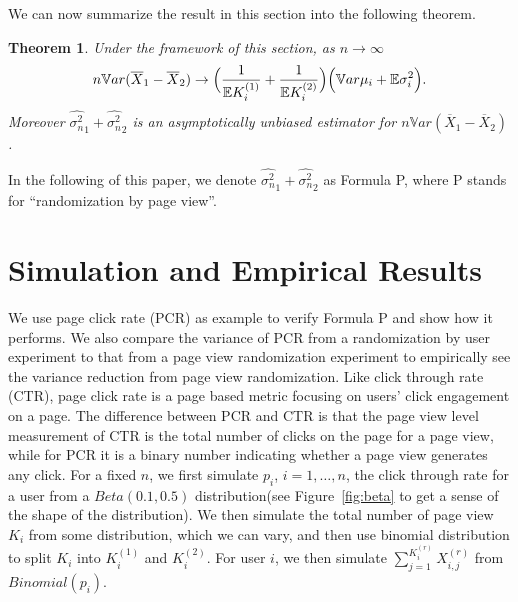 \documentclass[11pt]{asaproc}
\newcommand{\wht}{\widehat}
\newcommand{\var}{\ensuremath{\mathbb Var}}
\newcommand{\bbe}{\mathbb{E}}
\newcommand{\xbar}{\overline{X}}
\newcommand{\naiveest}{\wht{\sigma^2_n}}
\newtheorem{thm}{Theorem}
\begin{document}
We can now summarize the result in this section into the following theorem.
\begin{thm}\label{p_thm1}
Under the framework of this section, as $n\to\infty$
\begin{align*}
n\var(\xbar_1-\xbar_2) \to \Bigl(\frac{1 }{\bbe K_i^{(1)}}+\frac{1}{\bbe K_i^{(2)}}\Bigr) \Bigl( \var \mu_i + \bbe \sigma_i^2\Bigr).
\end{align*}
Moreover $\naiveest_1+\naiveest_2$ is an asymptotically unbiased estimator for $n\var(\xbar_1-\xbar_2)$.
\end{thm}

In the following of this paper, we denote $\naiveest_1+\naiveest_2$ as Formula P, where P stands for ``randomization by page view''.



\section{Simulation and Empirical Results}\label{empirical}
We use page click rate (PCR) as example to verify Formula P and show how it performs. We also compare the variance of PCR from a randomization by user experiment to that from a page view randomization experiment to empirically see the variance reduction from page view randomization. Like click through rate (CTR), page click rate is a page based metric focusing on users' click engagement on a page. The difference between PCR and CTR is that the page view level measurement of CTR is the total number of clicks on the page for a page view, while for PCR it is a binary number indicating whether a page view generates any click.  
For a fixed $n$, we first simulate $p_i$, $i=1,\dots,n$, the click through rate for a user from a $Beta(0.1,0.5)$ distribution(see Figure~\ref{fig:beta} to get a sense of the shape of the distribution). We then simulate the total number of page view $K_i$ from some distribution, which we can vary, and then use binomial distribution to split $K_i$ into $K_i^{(1)}$ and $K_i^{(2)}$. For user $i$, we then simulate $\sum_{j=1}^{K_i^{(r)}}X_{i,j}^{(r)}$ from $Binomial(p_i)$. 
\end{document}
